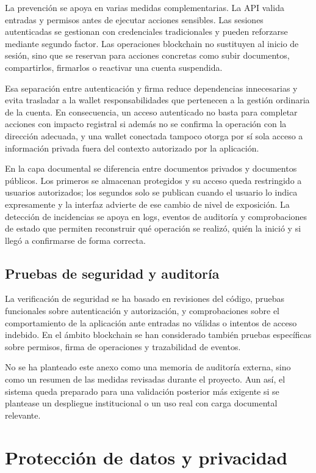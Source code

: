 \documentclass[11pt, a4paper]{article}
\begin{document}
La prevención se apoya en varias medidas complementarias. La API valida entradas y permisos antes de ejecutar acciones sensibles. Las sesiones autenticadas se gestionan con credenciales tradicionales y pueden reforzarse mediante segundo factor. Las operaciones blockchain no sustituyen al inicio de sesión, sino que se reservan para acciones concretas como subir documentos, compartirlos, firmarlos o reactivar una cuenta suspendida.

Esa separación entre autenticación y firma reduce dependencias innecesarias y evita trasladar a la wallet responsabilidades que pertenecen a la gestión ordinaria de la cuenta. En consecuencia, un acceso autenticado no basta para completar acciones con impacto registral si además no se confirma la operación con la dirección adecuada, y una wallet conectada tampoco otorga por sí sola acceso a información privada fuera del contexto autorizado por la aplicación.

En la capa documental se diferencia entre documentos privados y documentos públicos. Los primeros se almacenan protegidos y su acceso queda restringido a usuarios autorizados; los segundos solo se publican cuando el usuario lo indica expresamente y la interfaz advierte de ese cambio de nivel de exposición. La detección de incidencias se apoya en logs, eventos de auditoría y comprobaciones de estado que permiten reconstruir qué operación se realizó, quién la inició y si llegó a confirmarse de forma correcta.

\subsection{Pruebas de seguridad y auditoría}

La verificación de seguridad se ha basado en revisiones del código, pruebas funcionales sobre autenticación y autorización, y comprobaciones sobre el comportamiento de la aplicación ante entradas no válidas o intentos de acceso indebido. En el ámbito blockchain se han considerado también pruebas específicas sobre permisos, firma de operaciones y trazabilidad de eventos.

No se ha planteado este anexo como una memoria de auditoría externa, sino como un resumen de las medidas revisadas durante el proyecto. Aun así, el sistema queda preparado para una validación posterior más exigente si se plantease un despliegue institucional o un uso real con carga documental relevante.

\section{Protección de datos y privacidad}
\end{document}
